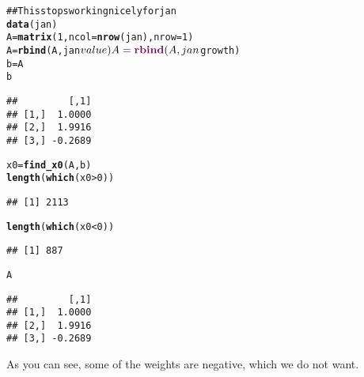 \documentclass{article}\usepackage{graphicx, color}
\makeatletter
\newcommand{\hlfunctioncall}[1]{\textcolor[rgb]{0.501960784313725,0,0.329411764705882}{\textbf{#1}}}%
\newcommand{\hlcomment}[1]{\textcolor[rgb]{0.180392156862745,0.6,0.341176470588235}{#1}}%
\newenvironment{kframe}{%
 \def\at@end@of@kframe{}%
 \ifinner\ifhmode%
  \def\at@end@of@kframe{\end{minipage}}%
  \begin{minipage}{\columnwidth}%
 \fi\fi%
 \def\FrameCommand##1{\hskip\@totalleftmargin \hskip-\fboxsep
 \colorbox{shadecolor}{##1}\hskip-\fboxsep
     \hskip-\linewidth \hskip-\@totalleftmargin \hskip\columnwidth}%
 \MakeFramed {\advance\hsize-\width
   \@totalleftmargin\z@ \linewidth\hsize
   \@setminipage}}%
 {\par\unskip\endMakeFramed%
 \at@end@of@kframe}
\newenvironment{knitrout}{}{} %
\makeatother
\begin{document}
\begin{knitrout}
\begin{kframe}
\begin{alltt}
\hlcomment{## This stops working nicely for jan}
\hlfunctioncall{data}(jan)
A = \hlfunctioncall{matrix}(1, ncol = \hlfunctioncall{nrow}(jan), nrow = 1)
A = \hlfunctioncall{rbind}(A, jan$value)
A = \hlfunctioncall{rbind}(A, jan$growth)
b = A %*% jan$portfolio
b
\end{alltt}
\begin{verbatim}
##         [,1]
## [1,]  1.0000
## [2,]  1.9916
## [3,] -0.2689
\end{verbatim}
\begin{alltt}
x0 = \hlfunctioncall{find_x0}(A, b)
\hlfunctioncall{length}(\hlfunctioncall{which}(x0 > 0))
\end{alltt}
\begin{verbatim}
## [1] 2113
\end{verbatim}
\begin{alltt}
\hlfunctioncall{length}(\hlfunctioncall{which}(x0 < 0))
\end{alltt}
\begin{verbatim}
## [1] 887
\end{verbatim}
\begin{alltt}
A %*% x0
\end{alltt}
\begin{verbatim}
##         [,1]
## [1,]  1.0000
## [2,]  1.9916
## [3,] -0.2689
\end{verbatim}
\end{kframe}
\end{knitrout}


As you can see, some of the weights are negative, which we do not
want.
\end{document}
